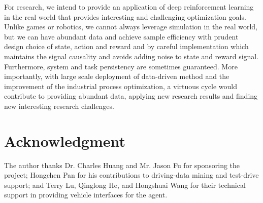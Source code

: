 \documentclass[conference]{IEEEtran}
\begin{document}
For research, we intend to provide an application of deep reinforcement learning in the real world that provides interesting and challenging optimization goals. Unlike games or robotics, we cannot always leverage simulation in the real world, but we can have abundant data and achieve sample efficiency with prudent design choice of state, action and reward and by careful implementation which maintains the signal causality and avoids adding noise to state and reward signal. Furthermore, system and task persistency are sometimes guaranteed. More importantly, with large scale deployment of data-driven method and the improvement of the industrial process optimization, a virtuous cycle would contribute to providing abundant data, applying new research results and finding new interesting research challenges.
\section*{Acknowledgment}

The author thanks Dr. Charles Huang and Mr. Jason Fu for sponsoring the project; Hongchen Pan for his contributions to driving-data mining and test-drive support; and Terry Lu, Qinglong He, and Hongshuai Wang for their technical support in providing vehicle interfaces for the agent.

\printbibliography
\end{document}
